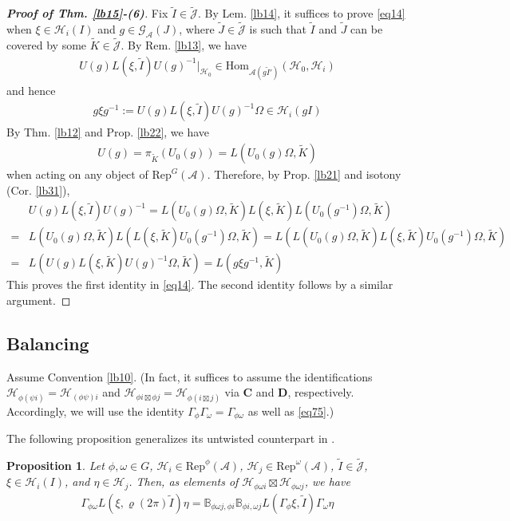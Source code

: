 \documentclass[11pt,b5paper,notitlepage]{article}
\theoremstyle{definition}
\theoremstyle{plain}
\newtheorem{pp}[df]{Proposition}
\newcommand{\wtd}{\widetilde}
\newcommand{\Hom}{\mathrm{Hom}}
\newcommand{\Rep}{\mathrm{Rep}}
\newcommand{\RepGA}{\mathrm{Rep}^G(\mathcal A)}
\newcommand{\GA}{\mathscr G_{\mathcal A}}
\newcommand{\Jtd}{\widetilde{\mathcal J}}
\newcommand{\mbf}{\mathbf}
\renewcommand{\Bbb}{\mathbb B}
\newcommand{\MA}{\mathcal A}
\newcommand{\MH}{\mathcal H}
\numberwithin{equation}{section}
\begin{document}
\begin{appendices}
\begin{proof}[\textbf{Proof of Thm. \ref{lb15}-(6)}]
Fix $\wtd I\in\Jtd$. By Lem. \ref{lb14}, it suffices to prove \eqref{eq14} when $\xi\in\MH_i(I)$ and $g\in\GA(J)$, where $\wtd J\in\Jtd$ is such that $\wtd I$ and $\wtd J$ can be covered by some $\wtd K\in\Jtd$. By Rem. \ref{lb13}, we have
\begin{align*}
U(g)L(\xi,\wtd I)U(g)^{-1}|_{\MH_0}\in\Hom_{\MA(g\wtd I')}(\MH_0,\MH_i)
\end{align*}
and hence
\begin{align*}
g\xi g^{-1}:=U(g)L(\xi,\wtd I)U(g)^{-1}\Omega\in\MH_i(gI)
\end{align*}
By Thm. \ref{lb12} and Prop. \ref{lb22}, we have
\begin{gather*}
U(g)=\pi_{\wtd K}(U_0(g))=L(U_0(g)\Omega,\wtd K)
\end{gather*}
when acting on any object of $\RepGA$. Therefore, by Prop. \ref{lb21} and isotony (Cor. \ref{lb31}),
\begin{align*}
&U(g)L(\xi,\wtd I)U(g)^{-1}=L(U_0(g)\Omega,\wtd K)L(\xi,\wtd K)L(U_0(g^{-1})\Omega,\wtd K)\\
=&L(U_0(g)\Omega,\wtd K)L(L(\xi,\wtd K)U_0(g^{-1})\Omega,\wtd K)=L(L(U_0(g)\Omega,\wtd K)L(\xi,\wtd K)U_0(g^{-1})\Omega,\wtd K)\\
=&L(U(g)L(\xi,\wtd K)U(g)^{-1}\Omega,\wtd K)=L(g\xi g^{-1},\wtd K)
\end{align*}
This proves the first
identity in \eqref{eq14}. The second identity follows by a similar argument.
\end{proof}


\subsection{Balancing}\label{lb139}

Assume Convention \ref{lb10}. (In fact, it suffices to assume the identifications $\MH_{\phi(\psi i)}=\MH_{(\phi\psi)i}$ and $\MH_{\phi i\boxtimes\phi j}=\MH_{\phi(i\boxtimes j)}$ via $\mbf C$ and $\mbf D$, respectively. Accordingly, we will use the identity $\Gamma_\phi\Gamma_\omega=\Gamma_{\phi\omega}$ as well as \eqref{eq75}.)


The following proposition generalizes its untwisted counterpart in \cite[Lem. 1.5]{Gui25}.

\begin{pp}\label{lb60}
Let $\phi,\omega\in G$, $\MH_i\in\Rep^\phi(\MA)$, $\MH_j\in\Rep^\omega(\MA)$, $\wtd I\in\Jtd$, $\xi\in\MH_{i}(I)$, and $\eta\in\MH_{j}$. Then, as elements of $\MH_{\phi\omega i}\boxtimes\MH_{\phi\omega j}$, we have
\begin{align*}
\Gamma_{\phi\omega}L(\xi,\varrho(2\pi)\wtd I)\eta=\Bbb_{\phi\omega j,\phi i}\Bbb_{\phi i,\omega j}L(\Gamma_\phi\xi,\wtd I)\Gamma_\omega\eta
\end{align*}
\end{pp}



\end{appendices}
\end{document}
